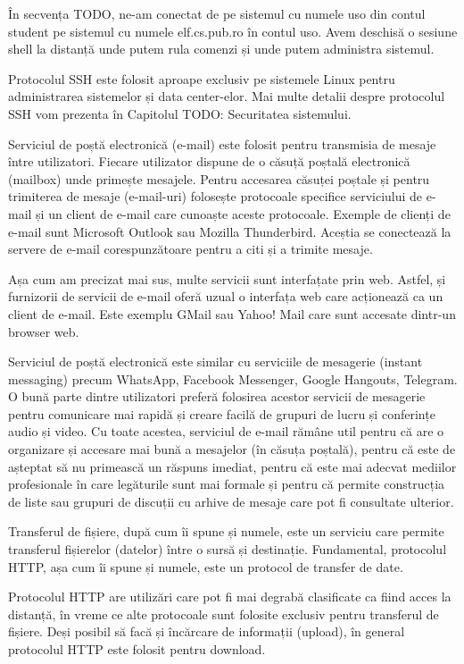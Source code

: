 În secvența TODO, ne-am conectat de pe sistemul cu numele uso din contul student pe sistemul cu numele elf.cs.pub.ro în contul uso. Avem deschisă o sesiune shell la distanță unde putem rula comenzi și unde putem administra sistemul.

Protocolul SSH este folosit aproape exclusiv pe sistemele Linux pentru administrarea sistemelor și data center-elor. Mai multe detalii despre protocolul SSH vom prezenta în Capitolul TODO: Securitatea sistemului.

Serviciul de poștă electronică (e-mail) este folosit pentru transmisia de mesaje între utilizatori. Fiecare utilizator dispune de o căsuță poștală electronică (mailbox) unde primește mesajele. Pentru accesarea căsuței poștale și pentru trimiterea de mesaje (e-mail-uri) folosește protocoale specifice serviciului de e-mail și un client de e-mail care cunoaște aceste protocoale. Exemple de clienți de e-mail sunt Microsoft Outlook sau Mozilla Thunderbird. Aceștia se conectează la servere de e-mail corespunzătoare pentru a citi și a trimite mesaje.

Așa cum am precizat mai sus, multe servicii sunt interfațate prin web. Astfel, și furnizorii de servicii de e-mail oferă uzual o interfața web care acționează ca un client de e-mail. Este exemplu GMail sau Yahoo! Mail care sunt accesate dintr-un browser web.

Serviciul de poștă electronică este similar cu serviciile de mesagerie (instant messaging) precum WhatsApp, Facebook Messenger, Google Hangouts, Telegram. O bună parte dintre utilizatori preferă folosirea acestor servicii de mesagerie pentru comunicare mai rapidă și creare facilă de grupuri de lucru și conferințe audio și video. Cu toate acestea, serviciul de e-mail rămâne util pentru că are o organizare și accesare mai bună a mesajelor (în căsuța poștală), pentru că este de așteptat să nu primească un răspuns imediat, pentru că este mai adecvat mediilor profesionale în care legăturile sunt mai formale și pentru că permite construcția de liste sau grupuri de discuții cu arhive de mesaje care pot fi consultate ulterior.

Transferul de fișiere, după cum îi spune și numele, este un serviciu care permite transferul fișierelor (datelor) între o sursă și destinație. Fundamental, protocolul HTTP, așa cum îi spune și numele, este un protocol de transfer de date.

Protocolul HTTP are utilizări care pot fi mai degrabă clasificate ca fiind acces la distanță, în vreme ce alte protocoale sunt folosite exclusiv pentru transferul de fișiere. Deși posibil să facă și încărcare de informații (upload), în general protocolul HTTP este folosit pentru download.


